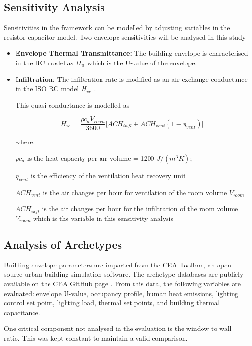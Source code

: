 
\subsection{Sensitivity Analysis}

Sensitivities in the framework can be modelled by adjusting variables in the resistor-capacitor model. Two envelope sensitivities will be analysed in this study

\begin{itemize}

\item \textbf{Envelope Thermal Transmittance:} The building envelope is characterised in the RC model as $H_w$ which is the U-value of the envelope. 
\item \textbf{Infiltration:} The infiltration rate is modified as an air exchange conductance in the ISO RC model $H_{ve}$ \cite{de2008iso,jayathissa2017AE}.

This quasi-conductance is modelled as

\begin{equation} 
\label{eq:vent}
      H_{ve}= \frac{\rho c_a V_{room}}{3600}\Big[ ACH_{infl} + ACH_{vent}(1-\eta_{vent}) \Big]
\end{equation}

where: 

$\rho c_a$ is the heat capacity per air volume = 1200 $J/(m^3 K)$;

$\eta_{vent}$ is the efficiency of the ventilation heat recovery unit

$ACH_{vent}$ is the air changes per hour for ventilation of the room volume $V_{room}$

$ACH_{infl}$ is the air changes per hour for the infiltration of the room volume $V_{room}$ which is the variable in this sensitivity analysis

\end{itemize}


\subsection{Analysis of Archetypes}

Building envelope parameters are imported from the CEA Toolbox, an open source urban building simulation software. The archetype databases are publicly available on the CEA GitHub page \cite{CEAArchetypes,CEAToolbox}. From this data, the following variables are evaluated: envelope U-value, occupancy profile, human heat emissions, lighting control set point, lighting load, thermal set points, and building thermal capacitance.

One critical component not analysed in the evaluation is the window to wall ratio. This was kept constant to maintain a valid comparison.




